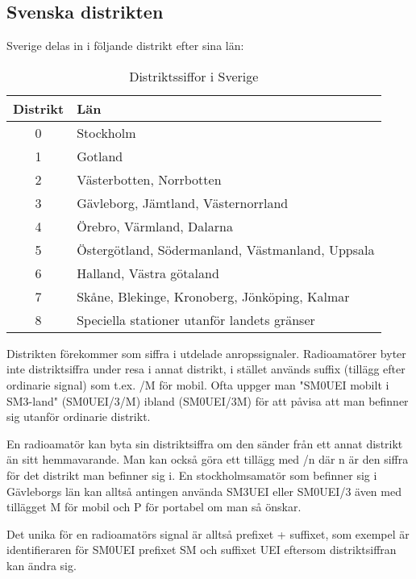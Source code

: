 \subsection{Svenska distrikten}

Sverige delas in i följande distrikt efter sina län:

\begin{table}[h]
	\centering
\begin{tabular}{cl}
	\textbf{Distrikt} & \textbf{Län}                                     \\ \hline %
	      0        & Stockholm                                        \\
	      1        & Gotland                                          \\
	      2        & Västerbotten, Norrbotten                         \\
	      3        & Gävleborg, Jämtland, Västernorrland              \\
	      4        & Örebro, Värmland, Dalarna                        \\
	      5        & Östergötland, Södermanland, Västmanland, Uppsala \\
	      6        & Halland, Västra götaland                         \\
	      7        & Skåne, Blekinge, Kronoberg, Jönköping, Kalmar    \\
	      8        & Speciella stationer utanför landets gränser
\end{tabular}
\caption{Distriktssiffor i Sverige}
\end{table}

Distrikten förekommer som siffra i utdelade anropssignaler. Radioamatörer 
byter inte distriktsiffra under resa i annat distrikt, i stället används 
suffix (tillägg efter ordinarie signal) som t.ex. /M för mobil. Ofta uppger 
man "SM0UEI mobilt i SM3-land" (SM0UEI/3/M) ibland (SM0UEI/3M) för att 
påvisa att man befinner sig utanför ordinarie distrikt.

En radioamatör kan byta sin distriktsiffra om den sänder från ett
annat distrikt än sitt hemmavarande. Man kan också göra ett tillägg
med /n där n är den siffra för det distrikt man befinner sig i. En
stockholmsamatör som befinner sig i Gävleborgs län kan alltså antingen
använda SM3UEI eller SM0UEI/3 även med tillägget M för mobil och P för
portabel om man så önskar.

Det unika för en radioamatörs signal är alltså prefixet + suffixet,
som exempel är identifieraren för SM0UEI prefixet SM och suffixet UEI
eftersom distriktsiffran kan ändra sig. 

